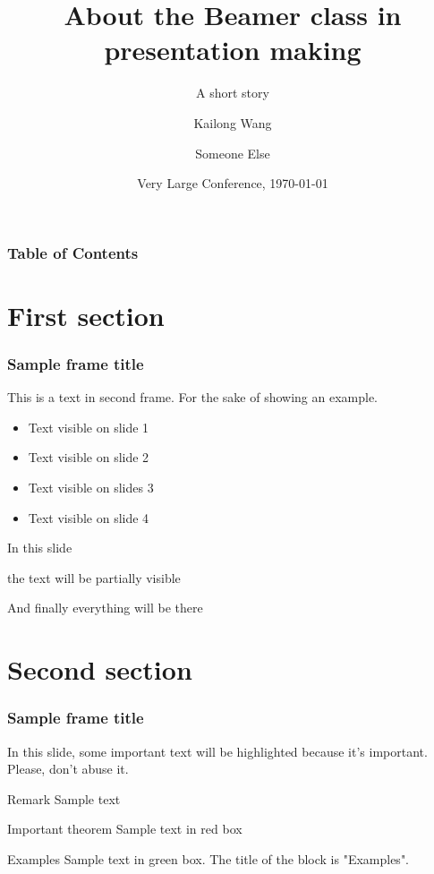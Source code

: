 \documentclass[11pt]{../formats/RU}
\title[About Beamer]{About the Beamer class in presentation making}
\subtitle{A short story}
\author[Kai] %
{Kailong Wang\inst{1} \and Someone Else\inst{2}}
\institute[Rutgers] %
{
  \inst{1}%
  Faculty of ECE\\
  Very Famous University
  \and
  \inst{2}%
  Faculty of Statistics\\
  Very Famous University
}
\date[\today] %
{Very Large Conference, \today}
\begin{document}
\frame{\titlepage}

\begin{frame}
\frametitle{Table of Contents}
\tableofcontents
\end{frame}


\section{First section}

\begin{frame}
\frametitle{Sample frame title}
This is a text in second frame. For the sake of showing an example.

\begin{itemize}
    \item<1-> Text visible on slide 1
    \item<2-> Text visible on slide 2
    \item<3> Text visible on slides 3
    \item<4-> Text visible on slide 4
\end{itemize}
\end{frame}



\begin{frame}
In this slide \pause

the text will be partially visible \pause

And finally everything will be there
\end{frame}

\section{Second section}

\begin{frame}
\frametitle{Sample frame title}

In this slide, some important text will be
\alert{highlighted} because it's important.
Please, don't abuse it.

\begin{block}{Remark}
Sample text
\end{block}

\begin{alertblock}{Important theorem}
Sample text in red box
\end{alertblock}

\begin{exampleblock}{Examples}
Sample text in green box. The title of the block is "Examples".
\end{exampleblock}
\end{frame}
\end{document}
